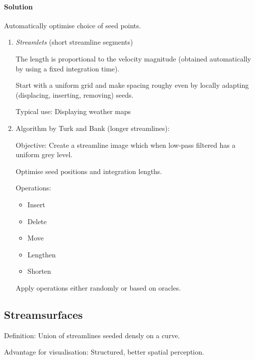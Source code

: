 \paragraph{Solution} Automatically optimise choice of seed points.
\begin{enumerate}
 \item \emph{Streamlets} (short streamline segments)
     
     The length is proportional to the velocity magnitude (obtained automatically by using a fixed integration time).
     
     Start with a uniform grid and make spacing roughy even by locally adapting (displacing, inserting, removing) seeds.

Typical use: Displaying weather maps

\item Algorithm by Turk and Bank (longer streamlines):

Objective: Create a streamline image which when low-pass filtered has a uniform grey level.

Optimise seed positions and integration lengths.

Operations:
\begin{itemize}
    \item Insert
    \item Delete
    \item Move
    \item Lengthen
    \item Shorten
\end{itemize}
Apply operations either randomly or based on oracles.

\end{enumerate}


\subsection{Streamsurfaces}
Definition: Union of streamlines seeded densly on a curve. 

Advantage for visualisation:
Structured, better spatial perception.

